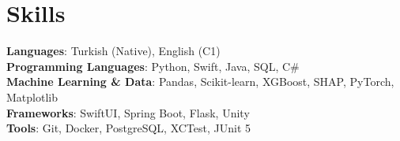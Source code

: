 \section{Skills}
    \begin{itemize}[leftmargin=0.15in, label={}]
	\small{\item{
		\textbf{Languages}{: Turkish (Native), English (C1)} \\
        \textbf{Programming Languages}{: Python, Swift, Java, SQL, C\#} \\
		\textbf{Machine Learning \& Data}{: Pandas, Scikit-learn, XGBoost, SHAP, PyTorch, Matplotlib} \\
        \textbf{Frameworks}{: SwiftUI, Spring Boot, Flask, Unity} \\
        \textbf{Tools}{: Git, Docker, PostgreSQL, XCTest, JUnit 5} \\
	}}
    \end{itemize}
